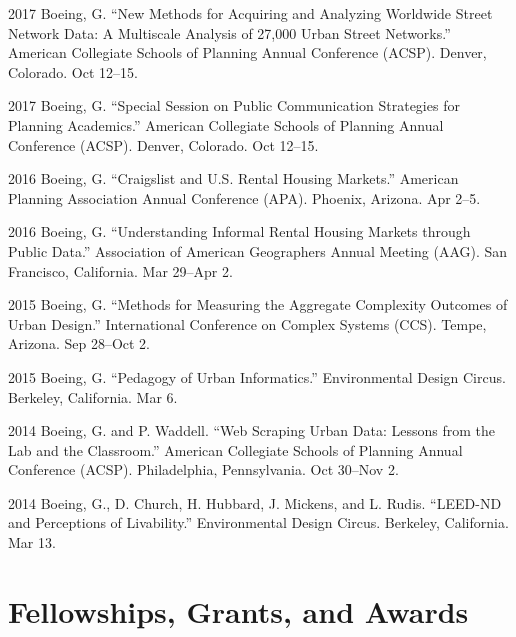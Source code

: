 \documentclass{academiccv}
\begin{document}
\begin{tablist}

\item[2017] \tab Boeing, G. \enquote{New Methods for Acquiring and Analyzing Worldwide Street Network Data: A Multiscale Analysis of 27,000 Urban Street Networks.} American Collegiate Schools of Planning Annual Conference (ACSP). Denver, Colorado. Oct 12--15.

\item[2017] \tab Boeing, G. \enquote{Special Session on Public Communication Strategies for Planning Academics.} American Collegiate Schools of Planning Annual Conference (ACSP). Denver, Colorado. Oct 12--15.

\item[2016] \tab Boeing, G. \enquote{Craigslist and U.S. Rental Housing Markets.} American Planning Association Annual Conference (APA). Phoenix, Arizona. Apr 2--5.

\item[2016] \tab Boeing, G. \enquote{Understanding Informal Rental Housing Markets through Public Data.} Association of American Geographers Annual Meeting (AAG). San Francisco, California. Mar 29--Apr 2.

\item[2015] \tab Boeing, G. \enquote{Methods for Measuring the Aggregate Complexity Outcomes of Urban Design.} International Conference on Complex Systems (CCS). Tempe, Arizona. Sep 28--Oct 2.

\item[2015] \tab Boeing, G. \enquote{Pedagogy of Urban Informatics.} Environmental Design Circus. Berkeley, California. Mar 6.

\item[2014] \tab Boeing, G. and P. Waddell. \enquote{Web Scraping Urban Data: Lessons from the Lab and the Classroom.} American Collegiate Schools of Planning Annual Conference (ACSP). Philadelphia, Pennsylvania. Oct 30--Nov 2.

\item[2014] \tab Boeing, G., D. Church, H. Hubbard, J. Mickens, and L. Rudis. \enquote{LEED-ND and Perceptions of Livability.} Environmental Design Circus. Berkeley, California. Mar 13.

\end{tablist}



\section*{Fellowships, Grants, and Awards}
\end{document}
